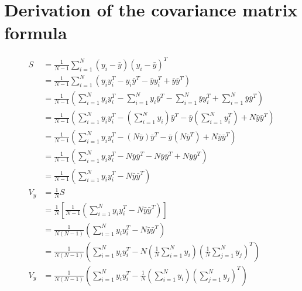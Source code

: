 \documentclass[a4paper,11pt]{article}
\begin{document}
\section{Derivation of the covariance matrix formula}
\label{app:eq5.1}
\begin{align*}
S &= \frac{1}{N-1} \sum_{i=1}^{N} (y_i - \bar{y})(y_i - \bar{y})^T \\
&= \frac{1}{N-1} \sum_{i=1}^{N} (y_i y_i^T - y_i \bar{y}^T - \bar{y} y_i^T + \bar{y}\bar{y}^T) \\
&= \frac{1}{N-1} \left( \sum_{i=1}^{N} y_i y_i^T - \sum_{i=1}^{N} y_i \bar{y}^T - \sum_{i=1}^{N} \bar{y} y_i^T + \sum_{i=1}^{N} \bar{y}\bar{y}^T \right) \\
&= \frac{1}{N-1} \left( \sum_{i=1}^{N} y_i y_i^T - \left(\sum_{i=1}^{N} y_i\right) \bar{y}^T - \bar{y} \left(\sum_{i=1}^{N} y_i^T\right) + N\bar{y}\bar{y}^T \right) \\
&= \frac{1}{N-1} \left( \sum_{i=1}^{N} y_i y_i^T - (N\bar{y})\bar{y}^T - \bar{y}(N\bar{y}^T) + N\bar{y}\bar{y}^T \right) \\
&= \frac{1}{N-1} \left( \sum_{i=1}^{N} y_i y_i^T - N\bar{y}\bar{y}^T - N\bar{y}\bar{y}^T + N\bar{y}\bar{y}^T \right) \\
&= \frac{1}{N-1} \left( \sum_{i=1}^{N} y_i y_i^T - N\bar{y}\bar{y}^T \right) \\
V_y &= \frac{1}{N} S \\
&= \frac{1}{N} \left[ \frac{1}{N-1} \left( \sum_{i=1}^{N} y_i y_i^T - N\bar{y}\bar{y}^T \right) \right] \\
&= \frac{1}{N(N-1)} \left( \sum_{i=1}^{N} y_i y_i^T - N\bar{y}\bar{y}^T \right) \\
&= \frac{1}{N(N-1)} \left( \sum_{i=1}^{N} y_i y_i^T - N \left(\frac{1}{N}\sum_{i=1}^{N} y_i\right) \left(\frac{1}{N}\sum_{j=1}^{N} y_j\right)^T \right) \\
V_y &= \frac{1}{N(N-1)} \left( \sum_{i=1}^{N} y_i y_i^T - \frac{1}{N} \left(\sum_{i=1}^{N} y_i\right) \left(\sum_{j=1}^{N} y_j\right)^T \right)
\end{align*}
\end{document}
